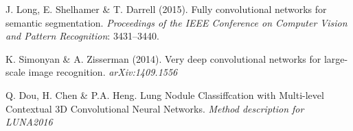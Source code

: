 \documentclass{article}
\begin{document}
\begin{thebibliography}{}
J. Long, E. Shelhamer \& T. Darrell (2015). Fully convolutional networks for semantic segmentation. \emph{Proceedings of the IEEE Conference on Computer Vision and Pattern Recognition}: 3431--3440.

K. Simonyan \& A. Zisserman (2014). Very deep convolutional networks for large-scale image recognition. \emph{arXiv:1409.1556}

Q. Dou, H. Chen \& P.A. Heng. Lung Nodule Classiffcation with Multi-level Contextual 3D Convolutional Neural Networks. \emph{Method description for LUNA2016}


\end{thebibliography}
\end{document}
